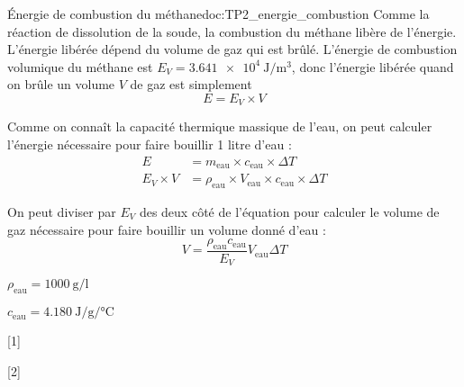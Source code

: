 \begin{doc}{Énergie de combustion du méthane}{doc:TP2_energie_combustion}
  Comme la réaction de dissolution de la soude, la combustion du méthane libère de l'énergie.
  L'énergie libérée dépend du volume de gaz qui est brûlé.
  L'énergie de combustion volumique du méthane est $E_V = \qty{3,641e4}{\joule\per\m\cubed}$, donc l'énergie libérée quand on brûle un volume $V$ de gaz est simplement 
  \begin{equation*}
    E = E_V \times V
  \end{equation*}

  Comme on connaît la capacité thermique massique de l'eau, on peut calculer l'énergie nécessaire pour faire bouillir 1 litre d'eau :
  \begin{align*}
    E &= m_\text{eau} \times c_\text{eau} \times \Delta T \\
    E_V \times V &= \rho_\text{eau} \times V_\text{eau} \times c_\text{eau} \times \Delta T
  \end{align*}

  On peut diviser par $E_V$ des deux côté de l'équation pour calculer le volume de gaz nécessaire pour faire bouillir un volume donné d'eau :
  \begin{equation*}
    V = \dfrac{\rho_\text{eau} c_\text{eau}}{E_V} V_\text{eau} \Delta T
  \end{equation*}

  \begin{donnees}
    \item $\rho_\text{eau} = \qty{1000}{\g\per\litre}$
    \item $c_\text{eau} = \qty{4,180}{\joule\per\g\per\degreeCelsius}$
  \end{donnees}
\end{doc}

[1]

[2]

